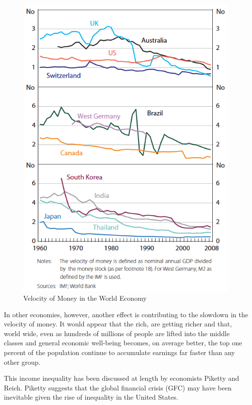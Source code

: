 \begin{figure}[ht]
\centering
\includegraphics[scale=0.5]{figures/RBAVelocity.png}
\caption{Velocity of Money in the World Economy\cite{RefWorks:251}}
\end{figure}

In other economies, however, another effect is contributing to the slowdown in the velocity of money. It would appear that the rich, are getting richer and that, world wide, even as hundreds of millions of people are lifted into the middle classes and general economic well-being becomes, on average better, the top one percent of the population continue to accumulate earnings far faster than any other group.

This income inequality has been discussed at length by economists Piketty and Reich\cite{Reich2014}. Piketty suggests that the global financial crisis (GFC) may have been inevitable given the rise of inequality in the United States.

